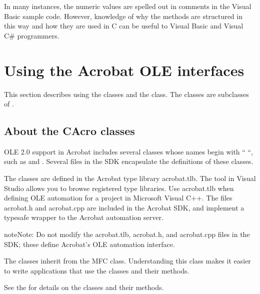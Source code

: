 \documentclass[letterpaper,12pt,english,openany,oneside]{sphinxmanual}
\begin{document}
In many instances, the numeric values are spelled out in comments in the Visual Basic sample code. However, knowledge of why the methods are structured in this way and how they are used in C can be useful to Visual Basic and Visual C\# programmers.




\section{Using the Acrobat OLE interfaces}
\label{\detokenize{IAC_DevApp_OLE_Support:using-the-acrobat-ole-interfaces}}
This section describes using the  classes and the  class. The  classes are subclasses of .


\subsection{About the CAcro classes}
\label{\detokenize{IAC_DevApp_OLE_Support:about-the-cacro-classes}}
OLE 2.0 support in Acrobat includes several classes whose names begin with “ “, such as  and . Several files in the SDK encapsulate the definitions of these classes.

The  classes are defined in the Acrobat type library acrobat.tlb. The  tool in Visual Studio allows you to browse registered type libraries. Use acrobat.tlb when defining OLE automation for a project in Microsoft Visual C++. The files acrobat.h and acrobat.cpp are included in the Acrobat SDK, and implement a type\sphinxhyphen{}safe wrapper to the Acrobat automation server.

\begin{sphinxadmonition}{note}{Note:}
Do not modify the acrobat.tlb, acrobat.h, and acrobat.cpp files in the SDK; these define Acrobat’s OLE automation interface.
\end{sphinxadmonition}

The  classes inherit from the MFC  class. Understanding this class makes it easier to write applications that use the  classes and their methods.

See the  for details on the  classes and their methods.
\end{document}

